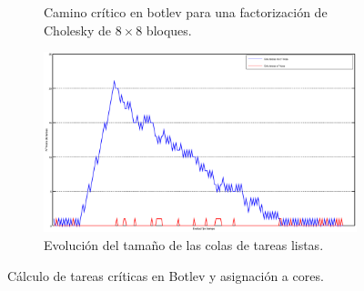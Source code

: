 \begin{figure}
  \centering
  
  \begin{subfigure}{.45\textwidth}
    \centering
    \setlength{\fboxsep}{5pt}
    \caption{Camino crítico en botlev para una factorización de Cholesky de
      $8\times8$ bloques.}
    \label{s3:fig:botlev_tdg}
  \end{subfigure}
  \begin{subfigure}{.45\textwidth}
    \centering
    \includegraphics[width=1\linewidth]{Figures/botlev-colas.eps}
    \caption{Evolución del tamaño de las colas de tareas listas.}
    \label{s3:fig:botlev_colas}
  \end{subfigure}  
  
  \caption{Cálculo de tareas críticas en Botlev y asignación a cores.}
  \label{s3:fig:botlev}
\end{figure}

